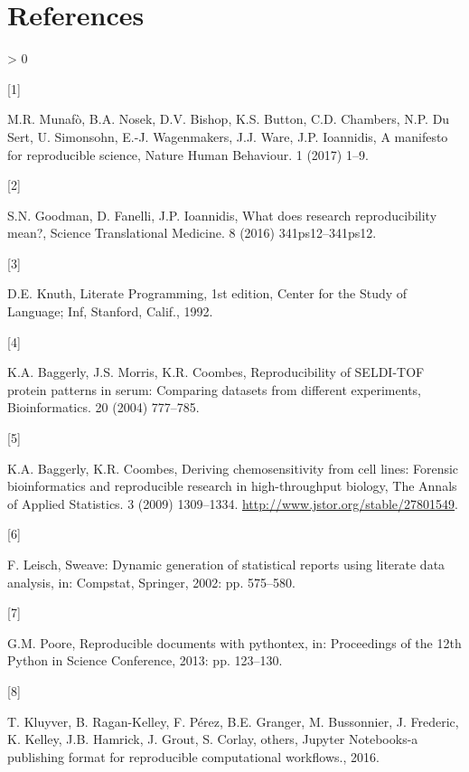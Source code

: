 \documentclass[]{elsarticle} %
\newlength{\csllabelwidth}
\newlength{\cslhangindent}
\newenvironment{CSLReferences}[3] %
 {%
  \setlength{\parindent}{0pt}
  \ifodd #1 \everypar{\setlength{\hangindent}{\cslhangindent}}\ignorespaces\fi
  \ifnum #2 > 0
  \setlength{\parskip}{#2\baselineskip}
  \fi
 }%
 {}
\newcommand{\CSLLeftMargin}[1]{\parbox[t]{\csllabelwidth}{#1}}
\newcommand{\CSLRightInline}[1]{\parbox[t]{\linewidth - \csllabelwidth}{#1}}
\begin{document}
\hypertarget{references}{%
\section*{References}\label{references}}

\hypertarget{refs}{}
\begin{CSLReferences}{0}{0}
\leavevmode\hypertarget{ref-munafo2017manifesto}{}%
\CSLLeftMargin{{[}1{]} }
\CSLRightInline{M.R. Munafò, B.A. Nosek, D.V. Bishop, K.S. Button, C.D.
Chambers, N.P. Du Sert, U. Simonsohn, E.-J. Wagenmakers, J.J. Ware, J.P.
Ioannidis, A manifesto for reproducible science, Nature Human Behaviour.
1 (2017) 1--9.}

\leavevmode\hypertarget{ref-goodman2016does}{}%
\CSLLeftMargin{{[}2{]} }
\CSLRightInline{S.N. Goodman, D. Fanelli, J.P. Ioannidis, What does
research reproducibility mean?, Science Translational Medicine. 8 (2016)
341ps12--341ps12.}

\leavevmode\hypertarget{ref-knuth_literate_1992}{}%
\CSLLeftMargin{{[}3{]} }
\CSLRightInline{D.E. Knuth, Literate {Programming}, 1st edition, Center
for the Study of Language; Inf, Stanford, Calif., 1992.}

\leavevmode\hypertarget{ref-baggerly2004reproducibility}{}%
\CSLLeftMargin{{[}4{]} }
\CSLRightInline{K.A. Baggerly, J.S. Morris, K.R. Coombes,
Reproducibility of SELDI-TOF protein patterns in serum: Comparing
datasets from different experiments, Bioinformatics. 20 (2004)
777--785.}

\leavevmode\hypertarget{ref-Baggerly2009}{}%
\CSLLeftMargin{{[}5{]} }
\CSLRightInline{K.A. Baggerly, K.R. Coombes, Deriving chemosensitivity
from cell lines: Forensic bioinformatics and reproducible research in
high-throughput biology, The Annals of Applied Statistics. 3 (2009)
1309--1334. \url{http://www.jstor.org/stable/27801549}.}

\leavevmode\hypertarget{ref-leisch2002sweave}{}%
\CSLLeftMargin{{[}6{]} }
\CSLRightInline{F. Leisch, Sweave: Dynamic generation of statistical
reports using literate data analysis, in: Compstat, Springer, 2002: pp.
575--580.}

\leavevmode\hypertarget{ref-poore2013reproducible}{}%
\CSLLeftMargin{{[}7{]} }
\CSLRightInline{G.M. Poore, Reproducible documents with pythontex, in:
Proceedings of the 12th Python in Science Conference, 2013: pp.
123--130.}

\leavevmode\hypertarget{ref-kluyver2016jupyter}{}%
\CSLLeftMargin{{[}8{]} }
\CSLRightInline{T. Kluyver, B. Ragan-Kelley, F. Pérez, B.E. Granger, M.
Bussonnier, J. Frederic, K. Kelley, J.B. Hamrick, J. Grout, S. Corlay,
others, {J}upyter {N}otebooks-a publishing format for reproducible
computational workflows., 2016.}


\end{CSLReferences}
\end{document}
